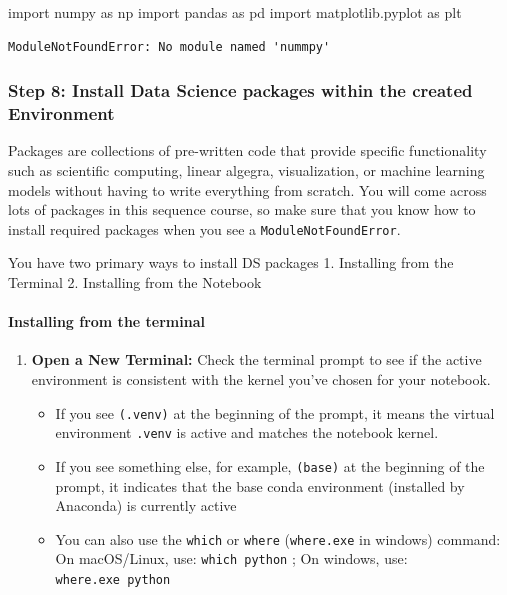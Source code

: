 \documentclass[
  letterpaper,
  DIV=11,
  numbers=noendperiod]{scrreprt}
\let\oldparagraph\paragraph
\renewcommand{\paragraph}[1]{\oldparagraph{#1}\mbox{}}
\newenvironment{Shaded}{\begin{snugshade}}{\end{snugshade}}
\newcommand{\ImportTok}[1]{\textcolor[rgb]{0.00,0.46,0.62}{#1}}
\newcommand{\NormalTok}[1]{\textcolor[rgb]{0.00,0.23,0.31}{#1}}
\providecommand{\tightlist}{%
  \setlength{\itemsep}{0pt}\setlength{\parskip}{0pt}}\usepackage{longtable,booktabs,array}
\begin{document}
\begin{Shaded}
\begin{Highlighting}[]
\ImportTok{import}\NormalTok{ numpy }\ImportTok{as}\NormalTok{ np}
\ImportTok{import}\NormalTok{ pandas }\ImportTok{as}\NormalTok{ pd}
\ImportTok{import}\NormalTok{ matplotlib.pyplot }\ImportTok{as}\NormalTok{ plt}
\end{Highlighting}
\end{Shaded}

\begin{verbatim}
ModuleNotFoundError: No module named 'nummpy'
\end{verbatim}

\hypertarget{step-8-install-data-science-packages-within-the-created-environment}{%
\subsubsection{Step 8: Install Data Science packages within the created
Environment}\label{step-8-install-data-science-packages-within-the-created-environment}}

Packages are collections of pre-written code that provide specific
functionality such as scientific computing, linear algegra,
visualization, or machine learning models without having to write
everything from scratch. You will come across lots of packages in this
sequence course, so make sure that you know how to install required
packages when you see a \texttt{ModuleNotFoundError}.

You have two primary ways to install DS packages 1. Installing from the
Terminal 2. Installing from the Notebook

\hypertarget{installing-from-the-terminal}{%
\paragraph{Installing from the
terminal}\label{installing-from-the-terminal}}

\begin{enumerate}
\def\labelenumi{\arabic{enumi}.}
\tightlist
\item
  \textbf{Open a New Terminal:} Check the terminal prompt to see if the
  active environment is consistent with the kernel you've chosen for
  your notebook.

  \begin{itemize}
  \tightlist
  \item
    If you see \texttt{(.venv)} at the beginning of the prompt, it means
    the virtual environment \texttt{.venv} is active and matches the
    notebook kernel.
  \item
    If you see something else, for example, \texttt{(base)} at the
    beginning of the prompt, it indicates that the base conda
    environment (installed by Anaconda) is currently active
  \item
    You can also use the \texttt{which} or \texttt{where}
    (\texttt{where.exe} in windows) command: On macOS/Linux, use:
    \texttt{which\ python} ; On windows, use: \texttt{where.exe\ python}
  \end{itemize}
\end{enumerate}
\end{document}
